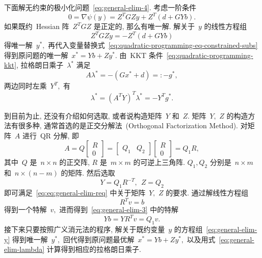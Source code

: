 下面解无约束的极小化问题~\eqref{eq:general-elim-4}. 考虑一阶条件
\begin{equation}
\label{eq:general-elim-5}
0 = \nabla \psi ({y}) = Z^T G Z {y} + Z^T \left( {d} + G Y {b} \right).
\end{equation}
如果既约~Hessian 阵~$Z^T G Z$ 是正定的, 那么有唯一解. 解关于~${y}$ 的线性方程组
\begin{equation}
\label{eq:general-elim-y}
Z^T G Z {y} = - Z^T \left( {d} + G Y {b} \right)
\end{equation}
得唯一解~${y}^*,$ 再代入变量替换式~\eqref{eq:quadratic-programming-eq-constrained-subs} 得到原问题的唯一解~${x}^* = Y {b} + Z {y}^*.$ 由~KKT 条件~\eqref{eq:quadratic-programming-kkt}, 拉格朗日乘子~${\lambda}^*$ 满足
\begin{equation}
\label{eq:general-elim-lagrange}
A {\lambda}^* = -\left( G {x}^* + {d} \right) =: - {g}^*,
\end{equation}
两边同时左乘~$Y^T,$ 有
\begin{equation}
\label{eq:general-elim-lambda}
{\lambda}^* = \left( A^T Y \right)^T {\lambda}^* = -Y^T {g}^*.
\end{equation}

到目前为止, 还没有介绍如何选取, 或者说构造矩阵~$Y$ 和~$Z.$ 矩阵~$Y,$ $Z$ 的构造方法有很多种, 通常首选的是正交分解法~(Orthogonal Factorization Method). 对矩阵~$A$ 进行~QR 分解, 即
\begin{equation}
\label{eq:quadratic-programming-qr-decomp-1}
A = Q \begin{bmatrix} R \\ 0 \end{bmatrix} = \begin{bmatrix} Q_1 & Q_2 \end{bmatrix} \begin{bmatrix} R \\ 0 \end{bmatrix} = Q_1 R,
\end{equation}
其中~$Q$ 是~$n \times n$ 的正交阵, $R$ 是~$m \times m$ 的可逆上三角阵. $Q_1, Q_2$ 分别是~$n \times m$ 和~$n \times (n - m)$ 的矩阵. 然后选取
\begin{equation}
\label{eq:quadratic-programming-qr-decomp-2}
Y = Q_1 R^{-T}, ~~ Z = Q_2
\end{equation}
即可满足~\eqref{eq:eq:general-elim-req} 中关于矩阵~$Y,$ $Z$ 的要求. 通过解线性方程组
\begin{equation*}
R^T {v} = {b}
\end{equation*}
得到一个特解~${v},$ 进而得到~\eqref{eq:general-elim-3} 中的特解
\begin{equation*}
Y {b} = Y R^T {v} = Q_1 {v}.
\end{equation*}
接下来只要按照广义消元法的程序, 解关于既约变量~${y}$ 的方程组~\eqref{eq:general-elim-y} 得到唯一解~${y}^*,$ 回代得到原问题最优解~${x}^* = Y {b} + Z {y}^*,$
以及用式~\eqref{eq:general-elim-lambda} 计算得到相应的拉格朗日乘子.

